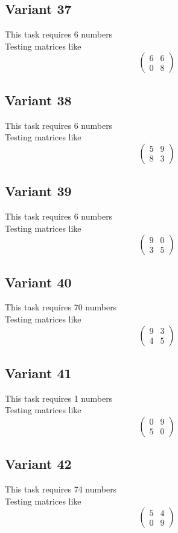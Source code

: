 \documentclass[11pt]{article}
\begin{document}
\subsection*{Variant 37}
This task requires 6 numbers\\
Testing matrices like \[ \begin{pmatrix} 6 & 6\\ 0 & 8 \end{pmatrix} \]

\subsection*{Variant 38}
This task requires 6 numbers\\
Testing matrices like \[ \begin{pmatrix} 5 & 9\\ 8 & 3 \end{pmatrix} \]

\subsection*{Variant 39}
This task requires 6 numbers\\
Testing matrices like \[ \begin{pmatrix} 9 & 0\\ 3 & 5 \end{pmatrix} \]

\subsection*{Variant 40}
This task requires 70 numbers\\
Testing matrices like \[ \begin{pmatrix} 9 & 3\\ 4 & 5 \end{pmatrix} \]

\subsection*{Variant 41}
This task requires 1 numbers\\
Testing matrices like \[ \begin{pmatrix} 0 & 9\\ 5 & 0 \end{pmatrix} \]

\subsection*{Variant 42}
This task requires 74 numbers\\
Testing matrices like \[ \begin{pmatrix} 5 & 4\\ 0 & 9 \end{pmatrix} \]
\end{document}
